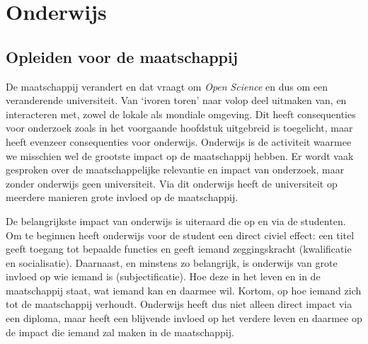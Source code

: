 \documentclass[smallauthor, chapterhaspagenum, nochapterinheader, pagenuminheader,  bigchapnum,medium2, tocpages,  garamond, titleinheader]{jote-book}
\begin{document}
	\chapter{Onderwijs }



	\section{Opleiden voor de maatschappij}



	De maatschappij verandert en dat vraagt om \emph{Open }\emph{Science} en dus om een veranderende universiteit. Van ‘ivoren toren' naar volop deel uitmaken van, en interacteren met, zowel de lokale als mondiale omgeving. Dit heeft consequenties voor onderzoek zoals in het voorgaande hoofdstuk uitgebreid is toegelicht, maar heeft evenzeer consequenties voor onderwijs. Onderwijs is de activiteit waarmee we misschien wel de grootste impact op de maatschappij hebben. Er wordt vaak gesproken over de maatschappelijke relevantie en impact van onderzoek, maar zonder onderwijs geen universiteit. Via dit onderwijs heeft de universiteit op meerdere manieren grote invloed op de maatschappij.



	De belangrijkste impact van onderwijs is uiteraard die op en via de studenten. Om te beginnen heeft onderwijs voor de student een direct civiel effect: een titel geeft toegang tot bepaalde functies en geeft iemand zeggingskracht (kwalificatie en socialisatie). Daarnaast, en minstens zo belangrijk, is onderwijs van grote invloed op wie iemand is (subjectificatie). Hoe deze in het leven en in de maatschappij staat, wat iemand kan en daarmee wil. Kortom, op hoe iemand zich tot de maatschappij verhoudt. Onderwijs heeft dus niet alleen direct impact via een diploma, maar heeft een blijvende invloed op het verdere leven en daarmee op de impact die iemand zal maken in de maatschappij.
\end{document}
